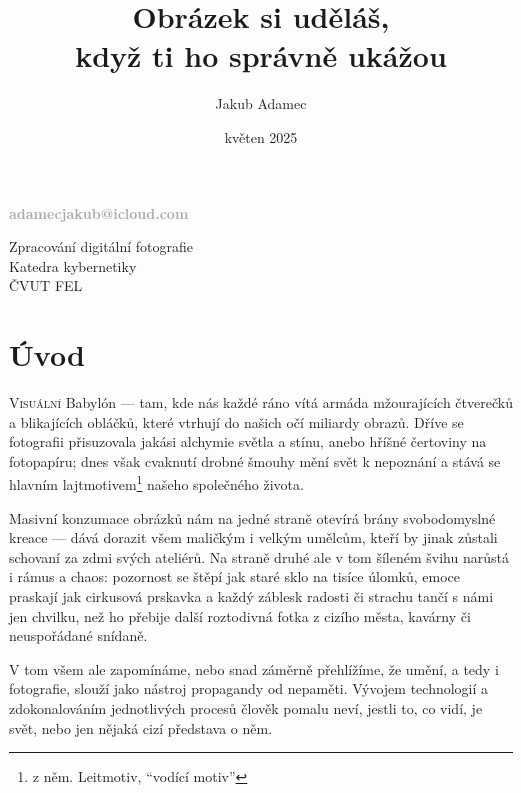 \documentclass[12pt]{article}
\title{%
  Obrázek si uděláš, \\
  \large když ti ho správně ukážou}
\author{Jakub Adamec}
\date{květen 2025}
\begin{document}
\makeatletter
\begin{titlepage}
    \centering
    \vspace*{1cm}

    {\Huge\bfseries \textcolor{DarkGray}{\@title} \par}
    \vspace{2.5cm}

    {\Large\bfseries \textcolor{DarkGray}{\@author} \par}
    \vspace{0.2cm}

    {\bfseries \textcolor{DarkGray}{adamecjakub@icloud.com} \par}
    \vspace{1.5cm}

    {\large\bfseries \textcolor{DarkGray}{\@date} \par}
    \vfill

    \vspace*{1cm}
    {\large Zpracování digitální fotografie \\ Katedra kybernetiky \\ ČVUT FEL\par}
\end{titlepage}
\makeatother

\pagestyle{fancy}

\section{Úvod}
\lettrine[lines=3, findent=5pt, nindent=0pt]{V}{isuální} Babylón --- tam, kde nás každé ráno vítá 
armáda mžourajících čtverečků a blikajících obláčků, které vtrhují do našich očí miliardy obrazů. Dříve se fotografii 
přisuzovala jakási alchymie světla a stínu, anebo hříšné čertoviny na fotopapíru; dnes však cvaknutí drobné šmouhy mění 
svět k nepoznání a stává se hlavním lajtmotivem\footnote{z něm. Leitmotiv, \enquote{vodící motiv}} našeho společného 
života.

Masivní konzumace obrázků nám na jedné straně otevírá brány svobodomyslné kreace --- dává dorazit všem maličkým i 
velkým umělcům, kteří by jinak zůstali schovaní za zdmi svých ateliérů. Na straně druhé ale v tom šíleném švihu narůstá 
i rámus a chaos: pozornost se štěpí jak staré sklo na tisíce úlomků, emoce praskají jak cirkusová prskavka a každý 
záblesk radosti či strachu tančí s námi jen chvilku, než ho přebije další roztodivná fotka z cizího města, kavárny či 
neuspořádané snídaně.

V tom všem ale zapomínáme, nebo snad záměrně přehlížíme, že umění, a tedy i fotografie, slouží jako nástroj propagandy 
od nepaměti. Vývojem technologií a zdokonalováním jednotlivých procesů člověk pomalu neví, jestli to, co vidí, 
je svět, nebo jen nějaká cizí představa o něm.
\end{document}
